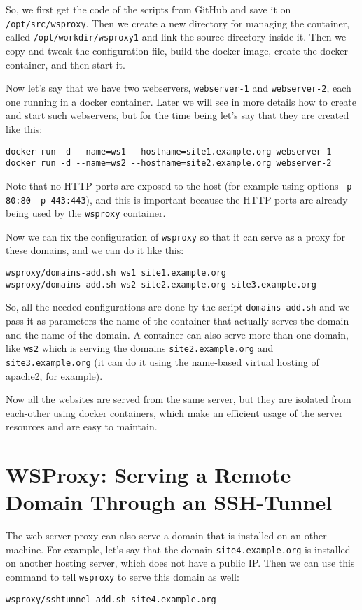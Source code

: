 \documentclass[a4paper]{article}
\begin{document}
So, we first get the code of the scripts from GitHub and save it on
\verb~/opt/src/wsproxy~. Then we create a new directory for managing
the container, called \verb~/opt/workdir/wsproxy1~ and link the source
directory inside it. Then we copy and tweak the configuration file,
build the docker image, create the docker container, and then start
it.

Now let's say that we have two webservers, \verb/webserver-1/ and
\verb/webserver-2/, each one running in a docker container. Later we
will see in more details how to create and start such webservers, but
for the time being let's say that they are created like this:
\begin{verbatim}
docker run -d --name=ws1 --hostname=site1.example.org webserver-1
docker run -d --name=ws2 --hostname=site2.example.org webserver-2
\end{verbatim}

Note that no HTTP ports are exposed to the host (for example using
options \verb=-p 80:80 -p 443:443=), and this is important because the
HTTP ports are already being used by the \verb/wsproxy/ container.

Now we can fix the configuration of \verb/wsproxy/ so that it can serve
as a proxy for these domains, and we can do it like this:
\begin{verbatim}
wsproxy/domains-add.sh ws1 site1.example.org
wsproxy/domains-add.sh ws2 site2.example.org site3.example.org
\end{verbatim}

So, all the needed configurations are done by the script
\verb~domains-add.sh~ and we pass it as parameters the name of the
container that actually serves the domain and the name of the
domain. A container can also serve more than one domain, like
\verb/ws2/ which is serving the domains \verb=site2.example.org= and
\verb=site3.example.org= (it can do it using the name-based virtual
hosting of apache2, for example).

Now all the websites are served from the same server, but they are
isolated from each-other using docker containers, which make an
efficient usage of the server resources and are easy to maintain.


\section{WSProxy: Serving a Remote Domain Through an SSH-Tunnel}

The web server proxy can also serve a domain that is installed on an
other machine. For example, let's say that the domain
\verb/site4.example.org/ is installed on another hosting server, which
does not have a public IP. Then we can use this command to tell
\verb/wsproxy/ to serve this domain as well:
\begin{verbatim}
wsproxy/sshtunnel-add.sh site4.example.org
\end{verbatim}
\end{document}
